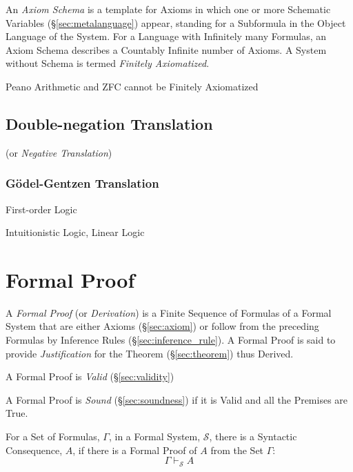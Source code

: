 An \emph{Axiom Schema} is a template for Axioms in which one or more Schematic
Variables (\S\ref{sec:metalanguage}) appear, standing for a Subformula in the
Object Language of the System. For a Language with Infinitely many Formulas, an
Axiom Schema describes a Countably Infinite number of Axioms. A System without
Schema is termed \emph{Finitely Axiomatized}.

Peano Arithmetic and ZFC cannot be Finitely Axiomatized



\subsection{Double-negation Translation}
\label{sec:double_negation_translation}

(or \emph{Negative Translation})



\subsubsection{G\"odel-Gentzen Translation}\label{sec:godel_gentzen}

First-order Logic

Intuitionistic Logic, Linear Logic



\section{Formal Proof} \label{sec:formal_proof}

A \emph{Formal Proof} (or \emph{Derivation}) is a Finite Sequence of
Formulas of a Formal System that are either Axioms (\S\ref{sec:axiom})
or follow from the preceding Formulas by Inference Rules
(\S\ref{sec:inference_rule}). A Formal Proof is said to provide
\emph{Justification} for the Theorem (\S\ref{sec:theorem}) thus
Derived.

A Formal Proof is \emph{Valid} (\S\ref{sec:validity})

A Formal Proof is \emph{Sound} (\S\ref{sec:soundness}) if it is Valid
and all the Premises are True.

For a Set of Formulas, $\Gamma$, in a Formal System, $\mathcal{S}$,
there is a Syntactic Consequence, $A$, if there is a Formal Proof of
$A$ from the Set $\Gamma$:
\[
  \Gamma \vdash_{\mathcal{S}} A
\]

